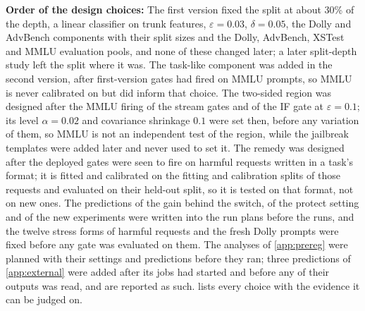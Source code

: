\documentclass{article}
\theoremstyle{plain}
\theoremstyle{definition}
\theoremstyle{remark}
\begin{document}
\textbf{Order of the design choices:}\label{app:protocol} The first version fixed the split at about 30\% of the
depth, a linear classifier on trunk features, $\varepsilon=0.03$, $\delta=0.05$, the Dolly and AdvBench components with
their split sizes and the Dolly, AdvBench, XSTest and MMLU evaluation pools, and none of these changed later; a later split-depth study
left the split where it was. The task-like component was added in the
second version, after first-version gates had fired on MMLU prompts, so MMLU is never calibrated on but did inform
that choice. The two-sided region was designed after the MMLU firing of the stream gates and of the IF gate at
$\varepsilon=0.1$; its level $\alpha=0.02$ and covariance shrinkage $0.1$ were set then, before any variation of them, so MMLU is not an independent test of the region, while the jailbreak templates were added later and
never used to set it. The remedy was designed after the deployed gates were seen to fire on harmful requests written
in a task's format; it is fitted and calibrated on the fitting and calibration splits of those requests and evaluated on their
held-out split, so it is tested on that format, not on new ones. The predictions of the gain behind the switch, of the
protect setting and of the new experiments were written into the run plans before the runs, and the twelve stress forms
of harmful requests and the fresh Dolly prompts were fixed before any gate was evaluated on them. The analyses of
\cref{app:prereg} were planned with their settings and predictions before they ran; three predictions of
\cref{app:external} were added after its jobs had started and before any of their outputs was read, and are
reported as such.  lists every choice with the evidence it can be judged on.
\end{document}
